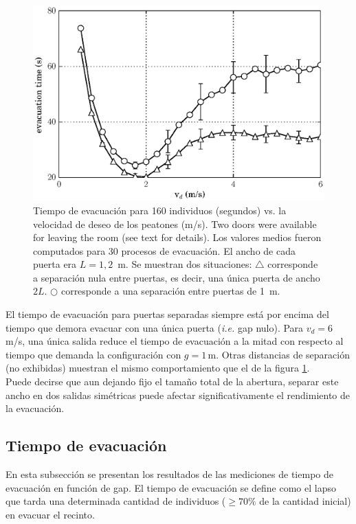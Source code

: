 \begin{figure}[H]
    \centering
    \includegraphics[scale=0.8]{figuras/fis_g.eps}
    \caption[width=5cm]{Tiempo de evacuación para 160 individuos (segundos) vs. la velocidad de deseo de los peatones (m/s). Two doors were available for leaving the room (see text for details). Los valores medios fueron computados para 30 procesos de evacuación. El ancho de cada puerta era $L=1,2$~m. Se muestran dos situaciones:  $\bigtriangleup$ corresponde a separación nula entre puertas, es decir, una única puerta de ancho  $2L$. $\bigcirc$ corresponde a una separación entre puertas de 1~m.}
    \label{fis_g}
\end{figure}

El tiempo de evacuación para puertas separadas siempre está por encima del tiempo que demora evacuar con una única puerta (\emph{i.e.} gap nulo). Para $v_d=6\,$m/s, una única salida reduce el tiempo de evacuación a la mitad con respecto al tiempo que demanda la configuración con $g=1\,$m. Otras distancias de separación (no exhibidas) muestran el mismo comportamiento que el de la figura \ref{fis_g}.\\

Puede decirse que aun dejando fijo el tamaño total de la abertura, separar este ancho en dos salidas simétricas puede afectar significativamente el rendimiento de la evacuación.

\subsection{Tiempo de evacuación}

En esta subsección se presentan los resultados de las mediciones de tiempo de evacuación en función de gap.
El tiempo de evacuación se define como el lapso que tarda una determinada cantidad de individuos ($\ge70\%$ de la cantidad inicial) en evacuar el recinto. \\

